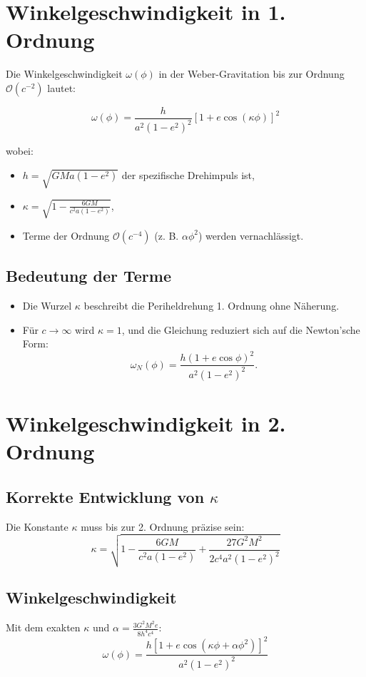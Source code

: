 \newpage
\section{Winkelgeschwindigkeit in 1. Ordnung}
Die Winkelgeschwindigkeit \(\omega(\phi)\) in der Weber-Gravitation bis zur Ordnung \(\mathcal{O}(c^{-2})\) lautet:

\begin{equation}
\omega(\phi) = \frac{h}{a^2(1 - e^2)^2} \left[1 + e \cos\left(\kappa\phi\right)\right]^2
\end{equation}

wobei:
\begin{itemize}
    \item \(h = \sqrt{GMa(1 - e^2)}\) der spezifische Drehimpuls ist,
    \item \(\kappa = \sqrt{1 - \frac{6GM}{c^2a(1 - e^2)}}\),
    \item Terme der Ordnung \(\mathcal{O}(c^{-4})\) (z. B. \(\alpha\phi^2\)) werden vernachlässigt.
\end{itemize}

\subsection*{Bedeutung der Terme}
\begin{itemize}
    \item Die Wurzel \(\kappa\) beschreibt die Periheldrehung 1. Ordnung ohne Näherung.
    \item Für \(c \to \infty\) wird \(\kappa = 1\), und die Gleichung reduziert sich auf die Newton’sche Form:
    \[
    \omega_N(\phi) = \frac{h(1 + e \cos\phi)^2}{a^2(1 - e^2)^2}.
    \]
\end{itemize}

\section{Winkelgeschwindigkeit in 2. Ordnung}

\subsection{Korrekte Entwicklung von \(\kappa\)}
Die Konstante \(\kappa\) muss bis zur 2. Ordnung präzise sein:
\begin{equation}
\kappa = \sqrt{1 - \frac{6GM}{c^2a(1-e^2)} + \frac{27G^2M^2}{2c^4a^2(1-e^2)^2}}
\end{equation}

\subsection{Winkelgeschwindigkeit}
Mit dem exakten \(\kappa\) und \(\alpha = \frac{3G^2M^2e}{8h^4c^4}\):
\begin{equation}
\boxed
{
    \omega(\phi) = \frac{h[1 + e\cos(\kappa\phi + \alpha\phi^2)]^2}{a^2(1-e^2)^2}
}
\end{equation}
